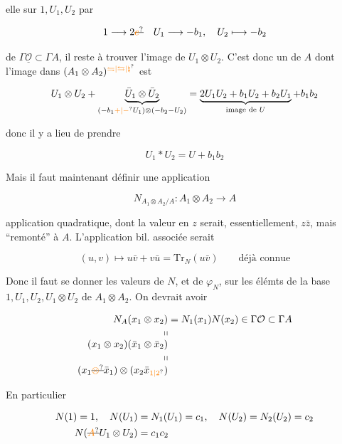 

elle  sur $1,U_1,U_2$ par

\[
1\longrightarrow2\deleted{\unsure{e}}\quad U_1\longrightarrow-b_1,\quad U_2\longmapsto-b_2
\]

 de $\Gamma\underline{\mathcal O}\subset\Gamma A$, il reste à trouver l'image de $U_1\otimes U_2$. C'est donc un  de $A$ dont l'image dans $(A_1\otimes A_2)^{\unsure{\leftrightharpoons|\leftrightarrows|\natural}}$ est

\[
U_1\otimes U_2+\underbrace{\bar U_1\otimes\bar U_2}_{(-b_1\unsure{+|-}U_1)\otimes(-b_2-U_2)}
=\underbrace{2U_1U_2+b_1U_2+b_2U_1}_{\text{image de }U}+b_1b_2
\]

 donc il y a lieu de prendre

\[
U_1*U_2=U+b_1b_2
\]

Mais il faut maintenant définir une application

\[
N_{A_1\otimes A_2/A}:A_1\otimes A_2\longrightarrow A
\]

application quadratique, dont la valeur en $z$ serait, essentiellement, $z\bar z$, mais ``remonté'' à $A$. L'application bil. associée serait

\[
(u,v)\longmapsto u\bar v+v\bar u=\mathrm{Tr}_N(u\bar v)\qquad\text{déjà connue}
\]

Donc il faut se donner les  valeurs de $N$, et de $\varphi_N$, sur les élémts de la base $1,U_1,U_2,U_1\otimes U_2$ de $A_1\otimes A_2$. On  devrait avoir

\[
\begin{aligned}
N_A(x_1\otimes x_2)&=N_1(x_1)N(x_2)\in\Gamma\mathcal O\subset\Gamma A\\[-2pt]
\shortparallel &\\[-3pt]
(x_1\otimes x_2)(\bar x_1\otimes\bar x_2)&\\[-2pt]
\shortparallel &\\[-3pt]
(x_1\deleted{\unsure{\otimes}}\bar x_1)\otimes(x_2\bar x_{\unsure{1|2}})&
\end{aligned}
\]

En particulier

\[
\begin{aligned}
N(1)=1,\quad N(U_1)&=N_1(U_1)=c_1,\quad N(U_2)=N_2(U_2)=c_2\\
N(\deleted{\unsure{A}}U_1\otimes U_2)&=c_1c_2
\end{aligned}
\]

